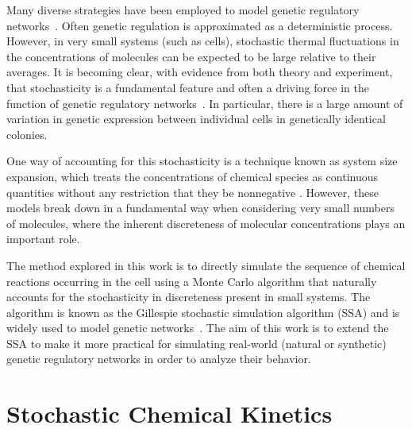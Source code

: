 \documentclass[english,letterpaper,12pt]{report}
\begin{document}
\begin{doublespacing}
Many diverse strategies have been employed to model genetic regulatory networks~\cite{review-in-numero}\cite{bistable-modeling}\cite{gillespie-ssa}\cite{cme-closure}. Often genetic regulation is approximated as a deterministic process. However, in very small systems (such as cells), stochastic thermal fluctuations in the concentrations of molecules can be expected to be large relative to their averages. It is becoming clear, with evidence from both theory and experiment, that stochasticity is a fundamental feature and often a driving force in the function of genetic regulatory networks~\cite{ecoli-decision}\cite{stoch-theories}\cite{stoch-single-cell}\cite{delay-oscillations}. In particular, there is a large amount of variation in genetic expression between individual cells in genetically identical colonies.

One way of accounting for this stochasticity is a technique known as system size expansion, which treats the concentrations of chemical species as continuous quantities without any restriction that they be nonnegative \cite{langevin-limit}\cite{delayed-deg-notes}. However, these models break down in a fundamental way when considering very small numbers of molecules, where the inherent discreteness of molecular concentrations plays an important role.

The method explored in this work is to directly simulate the sequence of chemical reactions occurring in the cell using a Monte Carlo algorithm that naturally accounts for the stochasticity in discreteness present in small systems. The algorithm is known as the Gillespie stochastic simulation algorithm (SSA) and is widely used to model genetic networks~\cite{we-chemkin}\cite{stoch-sys-bio}. The aim of this work is to extend the SSA to make it more practical for simulating real-world (natural or synthetic) genetic regulatory networks in order to analyze their behavior.


\section{Stochastic Chemical Kinetics} %
\label{sec:chemkin}


\end{doublespacing}
\end{document}

